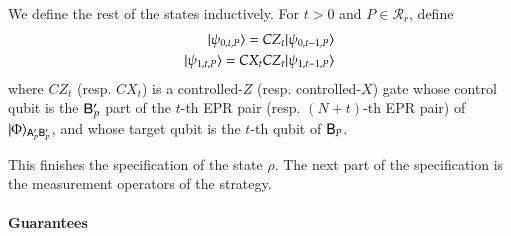 We define the rest of the states inductively. For $t > 0$ and $P \in \mathcal{R}_r$, define
\begin{align}
	|\psi_{0,t,P}\rangle = CZ_t |\psi_{0,t-1,P}\rangle \\
	|\psi_{1,t,P}\rangle = CX_t CZ_t |\psi_{1,t-1,P}\rangle
\end{align}
where $CZ_t$ (resp. $CX_t$) is a controlled-$Z$ (resp. controlled-$X$) gate whose control qubit is the ${\mathsf{B}}_P'$ part of the $t$-th EPR pair (resp. $(N+t)$-th EPR pair) of $|\Phi\rangle_{{\mathsf{A}}_P' {\mathsf{B}}_P'}$, and whose target qubit is the $t$-th qubit of ${\mathsf{B}}_P$. 


This finishes the specification of the state $\rho$. The next part of the specification is the measurement operators of the strategy. 


\paragraph{Guarantees}



